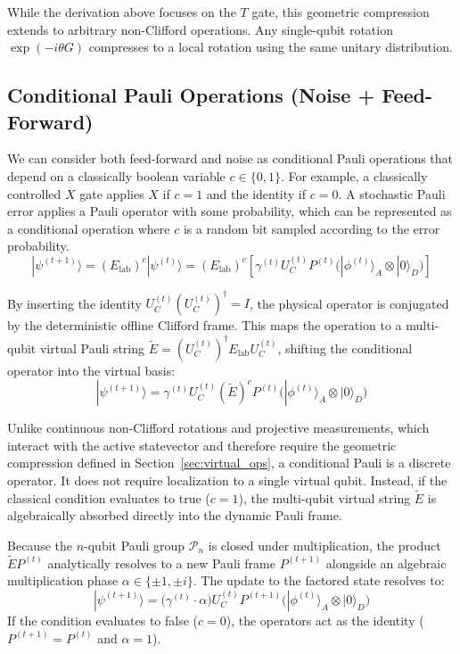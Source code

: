 \documentclass[11pt]{article}
\begin{document}
While the derivation above focuses on the $T$ gate, this geometric compression extends to arbitrary non-Clifford operations. Any single-qubit rotation $\exp(-i \theta G)$ compresses to a local rotation using the same unitary distribution.

\subsection{Conditional Pauli Operations (Noise + Feed-Forward)}
\label{sec:conditional_paulis}

We can consider both feed-forward and noise as conditional Pauli operations that depend on a classically boolean variable $c \in \{0, 1\}$. For example, a classically controlled $X$ gate applies $X$ if $c=1$ and the identity if $c=0$. A stochastic Pauli error applies a Pauli operator with some probability, which can be represented as a conditional operation where $c$ is a random bit sampled according to the error probability.
\begin{equation}
    |\psi^{(t+1)}\rangle = (E_{\text{lab}})^c |\psi^{(t)}\rangle = (E_{\text{lab}})^c \left[ \gamma^{(t)} U_C^{(t)} P^{(t)} \Big( |\phi^{(t)}\rangle_A \otimes |0\rangle_D \Big) \right]
\end{equation}

By inserting the identity $U_C^{(t)} (U_C^{(t)})^\dagger = I$, the physical operator is conjugated by the deterministic offline Clifford frame. This maps the operation to a multi-qubit virtual Pauli string $\tilde{E} = (U_C^{(t)})^\dagger E_{\text{lab}} U_C^{(t)}$, shifting the conditional operator into the virtual basis:
\begin{equation}
    |\psi^{(t+1)}\rangle = \gamma^{(t)} U_C^{(t)} (\tilde{E})^c P^{(t)} \Big( |\phi^{(t)}\rangle_A \otimes |0\rangle_D \Big)
\end{equation}

Unlike continuous non-Clifford rotations and projective measurements, which interact with the active statevector and therefore require the geometric compression defined in Section~\ref{sec:virtual_ops}, a conditional Pauli is a discrete operator. It does not require localization to a single virtual qubit. Instead, if the classical condition evaluates to true ($c=1$), the multi-qubit virtual string $\tilde{E}$ is algebraically absorbed directly into the dynamic Pauli frame.

Because the $n$-qubit Pauli group $\mathcal{P}_n$ is closed under multiplication, the product $\tilde{E} P^{(t)}$ analytically resolves to a new Pauli frame $P^{(t+1)}$ alongside an algebraic multiplication phase $\alpha \in \{\pm 1, \pm i\}$. The update to the factored state resolves to:
\begin{equation}
    |\psi^{(t+1)}\rangle = \Big( \gamma^{(t)} \cdot \alpha \Big) U_C^{(t)} P^{(t+1)} \Big( |\phi^{(t)}\rangle_A \otimes |0\rangle_D \Big)
\end{equation}
If the condition evaluates to false ($c=0$), the operators act as the identity ($P^{(t+1)} = P^{(t)}$ and $\alpha = 1$).
\end{document}
